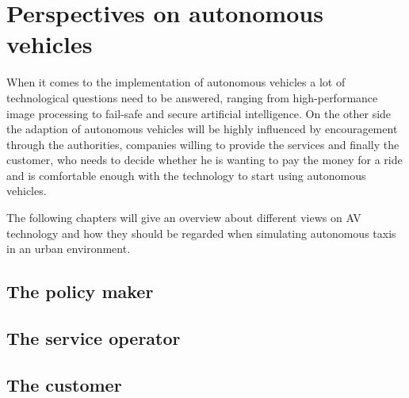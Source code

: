 \section{Perspectives on autonomous vehicles}

When it comes to the implementation of autonomous vehicles a lot of technological
questions need to be answered, ranging from high-performance image processing
to fail-safe and secure artificial intelligence. On the other side the adaption
of autonomous vehicles will be highly influenced by encouragement through the
authorities, companies willing to provide the services and finally the customer,
who needs to decide whether he is wanting to pay the money for a ride and is
comfortable enough with the technology to start using autonomous vehicles.

The following chapters will give an overview about different views on AV technology
and how they should be regarded when simulating autonomous taxis in an urban
environment.

\subsection{The policy maker}


\subsection{The service operator}


\subsection{The customer}

